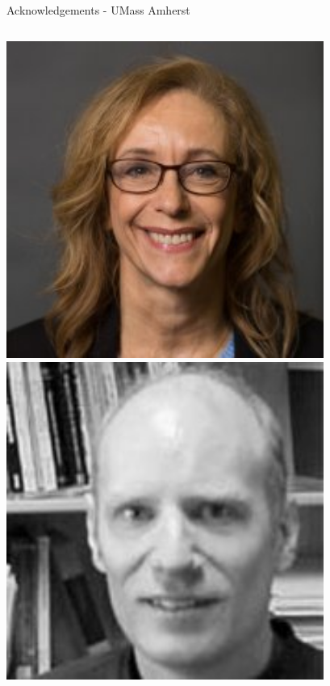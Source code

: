 \documentclass[aspectratio=169]{beamer}
\begin{document}
\begin{frame}{Acknowledgements - UMass Amherst}
\begin{columns}
            \includegraphics[width=0.99\textwidth]{people/umassprofs/whitbourne.png}
            \includegraphics[width=0.99\textwidth]{people/umassprofs/tuominen.png}

\end{columns}
\end{frame}
\end{document}
